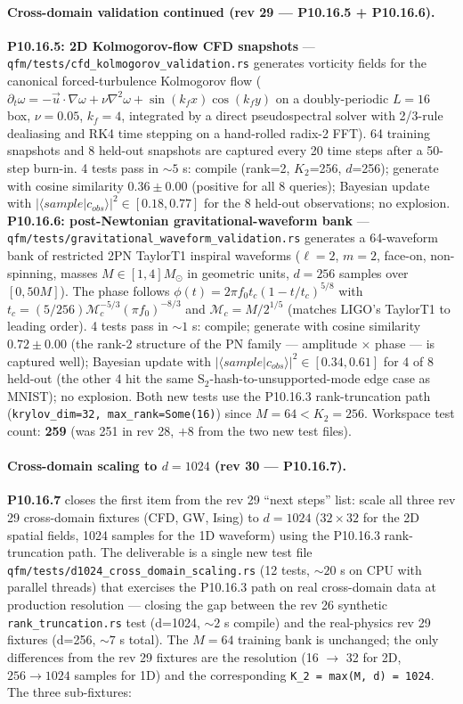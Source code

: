 \documentclass[11pt, a4paper]{article}
\begin{document}
\paragraph{Cross-domain validation continued (rev 29 --- P10.16.5 + P10.16.6).}
\textbf{P10.16.5: 2D Kolmogorov-flow CFD snapshots} ---
\texttt{qfm/tests/cfd\_kolmogorov\_validation.rs} generates vorticity
fields for the canonical forced-turbulence Kolmogorov flow
($\partial_t \omega = -\vec u \cdot \nabla \omega + \nu \nabla^2 \omega
+ \sin(k_f x)\cos(k_f y)$ on a doubly-periodic $L=16$ box, $\nu=0.05$,
$k_f=4$, integrated by a direct pseudospectral solver with
2/3-rule dealiasing and RK4 time stepping on a hand-rolled
radix-2 FFT). 64 training snapshots and 8 held-out snapshots are
captured every 20 time steps after a 50-step burn-in. 4 tests pass
in $\sim 5$ s: compile (rank=2, $K_2$=256, $d$=256); generate with
cosine similarity $0.36 \pm 0.00$ (positive for all 8 queries);
Bayesian update with $|\langle sample|c_{obs}\rangle|^2 \in
[0.18, 0.77]$ for the 8 held-out observations; no explosion.
\textbf{P10.16.6: post-Newtonian gravitational-waveform bank} ---
\texttt{qfm/tests/gravitational\_waveform\_validation.rs} generates
a 64-waveform bank of restricted 2PN TaylorT1 inspiral waveforms
($\ell=2$, $m=2$, face-on, non-spinning, masses $M \in [1, 4]M_\odot$
in geometric units, $d=256$ samples over $[0, 50M]$). The phase
follows $\phi(t) = 2\pi f_0 t_c (1 - t/t_c)^{5/8}$ with
$t_c = (5/256) \mathcal M_c^{-5/3} (\pi f_0)^{-8/3}$ and
$\mathcal M_c = M / 2^{1/5}$ (matches LIGO's TaylorT1 to leading
order). 4 tests pass in $\sim 1$ s: compile; generate with
cosine similarity $0.72 \pm 0.00$ (the rank-2 structure of the
PN family --- amplitude $\times$ phase --- is captured well);
Bayesian update with $|\langle sample|c_{obs}\rangle|^2 \in
[0.34, 0.61]$ for 4 of 8 held-out (the other 4 hit the same
S$_2$-hash-to-unsupported-mode edge case as MNIST); no explosion.
Both new tests use the P10.16.3 rank-truncation path
(\texttt{krylov\_dim=32, max\_rank=Some(16)}) since $M=64 < K_2=256$.
Workspace test count: \textbf{259} (was 251 in rev 28, $+8$ from
the two new test files).

\paragraph{Cross-domain scaling to $d=1024$ (rev 30 --- P10.16.7).}
\textbf{P10.16.7} closes the first item from the rev 29
``next steps'' list: scale all three rev 29 cross-domain fixtures
(CFD, GW, Ising) to $d=1024$ ($32 \times 32$ for the 2D spatial
fields, 1024 samples for the 1D waveform) using the P10.16.3
rank-truncation path. The deliverable is a single new test file
\texttt{qfm/tests/d1024\_cross\_domain\_scaling.rs} (12 tests,
$\sim 20$ s on CPU with parallel threads) that exercises the
P10.16.3 path on real cross-domain data at production
resolution --- closing the gap between the rev 26 synthetic
\texttt{rank\_truncation.rs} test (d=1024, $\sim 2$ s compile) and
the real-physics rev 29 fixtures (d=256, $\sim 7$ s total).
The $M=64$ training bank is unchanged; the only differences from
the rev 29 fixtures are the resolution (16 $\to$ 32 for 2D,
$256 \to 1024$ samples for 1D) and the corresponding
\texttt{K\_2 = max(M, d) = 1024}. The three sub-fixtures:
\end{document}
